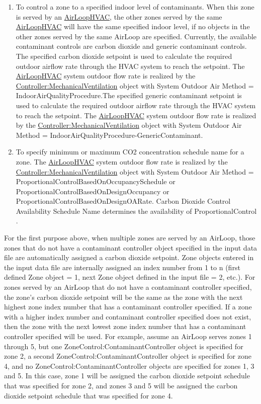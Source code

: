\begin{enumerate}
\def\labelenumi{\arabic{enumi})}
\item
  To control a zone to a specified indoor level of contaminants. When this zone is served by an \hyperref[airloophvac]{AirLoopHVAC}, the other zones served by the same \hyperref[airloophvac]{AirLoopHVAC} will have the same specified indoor level, if no objects in the other zones served by the same AirLoop are specified. Currently, the available contaminant controls are carbon dioxide and generic contaminant controls. The specified carbon dioxide setpoint is used to calculate the required outdoor airflow rate through the HVAC system to reach the setpoint. The \hyperref[airloophvac]{AirLoopHVAC} system outdoor flow rate is realized by the \hyperref[controllermechanicalventilation]{Controller:MechanicalVentilation} object with System Outdoor Air Method = IndoorAirQualityProcedure.The specified generic contaminant setpoint is used to calculate the required outdoor airflow rate through the HVAC system to reach the setpoint. The \hyperref[airloophvac]{AirLoopHVAC} system outdoor flow rate is realized by the \hyperref[controllermechanicalventilation]{Controller:MechanicalVentilation} object with System Outdoor Air Method = IndoorAirQualityProcedure-GenericContaminant.
\item
  To specify minimum or maximum CO2 concentration schedule name for a zone. The \hyperref[airloophvac]{AirLoopHVAC} system outdoor flow rate is realized by the \hyperref[controllermechanicalventilation]{Controller:MechanicalVentilation} object with System Outdoor Air Method = ProportionalControlBasedOnOccupancySchedule or ProportionalControlBasedOnDesignOccupancy or ProportionalControlBasedOnDesignOARate. Carbon Dioxide Control Availability Schedule Name determines the availability of ProportionalControl .
\end{enumerate}

For the first purpose above, when multiple zones are served by an AirLoop, those zones that do not have a contaminant controller object specified in the input data file are automatically assigned a carbon dioxide setpoint. Zone objects entered in the input data file are internally assigned an index number from 1 to n (first defined Zone object = 1, next Zone object defined in the input file = 2, etc.). For zones served by an AirLoop that do not have a contaminant controller specified, the zone's carbon dioxide setpoint will be the same as the zone with the next highest zone index number that has a contaminant controller specified. If a zone with a higher index number and contaminant controller specified does not exist, then the zone with the next lowest zone index number that has a contaminant controller specified will be used. For example, assume an AirLoop serves zones 1 through 5, but one ZoneControl:ContaminantController object is specified for zone 2, a second ZoneControl:ContaminantController object is specified for zone 4, and no ZoneControl:ContaminantController objects are specified for zones 1, 3 and 5. In this case, zone 1 will be assigned the carbon dioxide setpoint schedule that was specified for zone 2, and zones 3 and 5 will be assigned the carbon dioxide setpoint schedule that was specified for zone 4.

